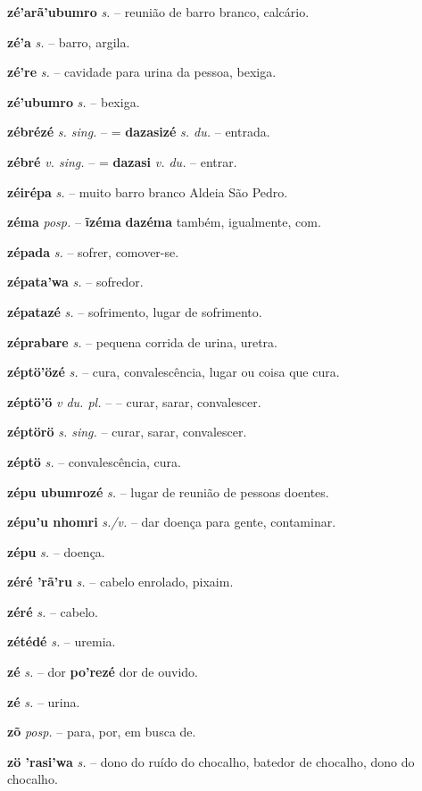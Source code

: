 \textbf{zé'arã'ubumro} \textit{s.} -- reunião de barro branco, calcário.

\textbf{zé'a} \textit{s.} -- barro, argila.

\textbf{zé're} \textit{s.} -- cavidade para urina da pessoa, bexiga.

\textbf{zé'ubumro} \textit{s.} -- bexiga.

\textbf{zébrézé} \textit{s. sing.} -- = \textbf{dazasizé} \textit{s. du.} -- entrada.

\textbf{zébré} \textit{v. sing.} -- = \textbf{dazasi} \textit{v. du.} -- entrar.

\textbf{zéirépa} \textit{s.} -- muito barro branco  Aldeia São Pedro.

\textbf{zéma} \textit{posp.} -- \textbf{ĩzéma} \textbf{dazéma} também, igualmente, com.

\textbf{zépada} \textit{s.} -- sofrer, comover-se.

\textbf{zépata'wa} \textit{s.} -- sofredor.

\textbf{zépatazé} \textit{s.} -- sofrimento, lugar de sofrimento.

\textbf{zéprabare} \textit{s.} -- pequena corrida de urina, uretra.

\textbf{zéptö'özé} \textit{s.} -- cura, convalescência, lugar ou coisa que cura.

\textbf{zéptö'ö} \textit{v du. pl.} -- -- curar, sarar, convalescer.

\textbf{zéptörö} \textit{s. sing.} -- curar, sarar, convalescer.

\textbf{zéptö} \textit{s.} -- convalescência, cura.

\textbf{zépu ubumrozé} \textit{s.} -- lugar de reunião de pessoas doentes.

\textbf{zépu'u nhomri} \textit{s./v.} -- dar doença para gente, contaminar.

\textbf{zépu} \textit{s.} -- doença.

\textbf{zéré 'rã'ru} \textit{s.} -- cabelo enrolado, pixaim.

\textbf{zéré} \textit{s.} -- cabelo.

\textbf{zétédé} \textit{s.} -- uremia.

\textbf{zé} \textit{s.} -- dor  \textbf{po'rezé} dor de ouvido.

\textbf{zé} \textit{s.} -- urina.

\textbf{zõ} \textit{posp.} -- para, por, em busca de.

\textbf{zö 'rasi'wa} \textit{s.} -- dono do ruído do chocalho, batedor de chocalho, dono do chocalho.

